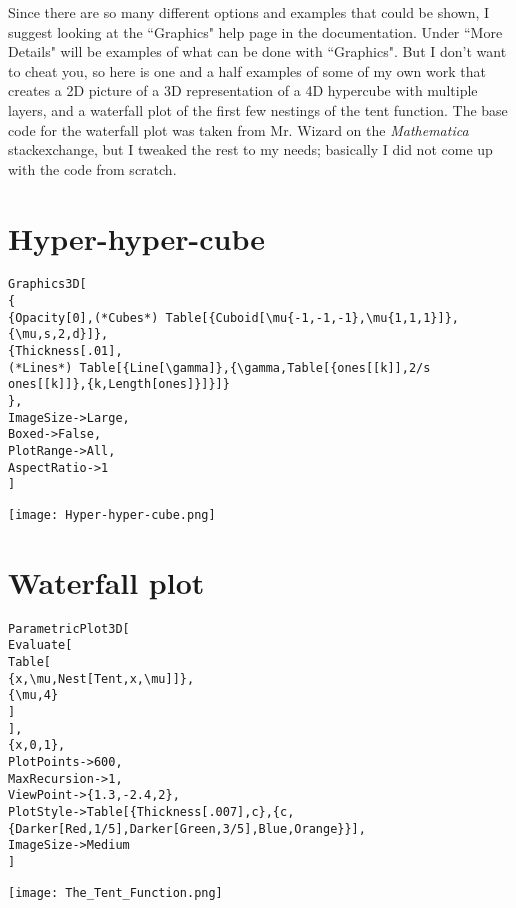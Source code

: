 \documentclass[11pt,letterpaper,twoside,titlepage]{report}
\newcommand{\Mathematica}{\textit{Mathematica} }
\begin{document}
			Since there are so many different options and examples that could be shown, I suggest looking at the ``Graphics" help page in the documentation.  Under ``More Details" will be examples of what can be done with ``Graphics". But I don't want to cheat you, so here is one and a half examples of some of my own work that creates a 2D picture of a 3D representation of a 4D hypercube with multiple layers, and a waterfall plot of the first few nestings of the tent function.  The base code for the waterfall plot was taken from Mr. Wizard on the \Mathematica stackexchange, but I tweaked the rest to my needs; basically I did not come up with the code from scratch.
			
\newpage

			\section{Hyper-hyper-cube}
		
			\begin{verbatim}
Graphics3D[
{
{Opacity[0],(*Cubes*) Table[{Cuboid[\mu{-1,-1,-1},\mu{1,1,1}]},{\mu,s,2,d}]},
{Thickness[.01],
(*Lines*) Table[{Line[\gamma]},{\gamma,Table[{ones[[k]],2/s ones[[k]]},{k,Length[ones]}]}]}
},
ImageSize->Large,
Boxed->False,
PlotRange->All,
AspectRatio->1
]
			\end{verbatim}
			
			\begin{center}
			
				\texttt{[image: Hyper-hyper-cube.png]}
			
			\end{center}
			
\newpage

			\section{Waterfall plot}
			
			\begin{verbatim}
ParametricPlot3D[
Evaluate[
Table[
{x,\mu,Nest[Tent,x,\mu]]},
{\mu,4}
]
],
{x,0,1},
PlotPoints->600,
MaxRecursion->1,
ViewPoint->{1.3,-2.4,2},
PlotStyle->Table[{Thickness[.007],c},{c,{Darker[Red,1/5],Darker[Green,3/5],Blue,Orange}}],
ImageSize->Medium
]			
			\end{verbatim}
			
			\begin{center}
			
				\texttt{[image: The\_Tent\_Function.png]}
			
			\end{center}
		
\end{document}
